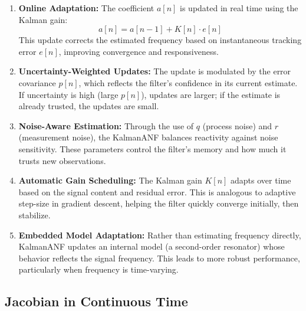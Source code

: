 \documentclass{article}
\begin{document}
\begin{enumerate}
  \item \textbf{Online Adaptation:} The coefficient \( a[n] \) is updated in real time using the Kalman gain:
  \[
  a[n] = a[n-1] + K[n] \cdot e[n]
  \]
  This update corrects the estimated frequency based on instantaneous tracking error \( e[n] \), improving convergence and responsiveness.

  \item \textbf{Uncertainty-Weighted Updates:} The update is modulated by the error covariance \( p[n] \), which reflects the filter's confidence in its current estimate. If uncertainty is high (large \( p[n] \)), updates are larger; if the estimate is already trusted, the updates are small.

  \item \textbf{Noise-Aware Estimation:} Through the use of \( q \) (process noise) and \( r \) (measurement noise), the KalmanANF balances reactivity against noise sensitivity. These parameters control the filter’s memory and how much it trusts new observations.

  \item \textbf{Automatic Gain Scheduling:} The Kalman gain \( K[n] \) adapts over time based on the signal content and residual error. This is analogous to adaptive step-size in gradient descent, helping the filter quickly converge initially, then stabilize.

  \item \textbf{Embedded Model Adaptation:} Rather than estimating frequency directly, KalmanANF updates an internal model (a second-order resonator) whose behavior reflects the signal frequency. This leads to more robust performance, particularly when frequency is time-varying.
\end{enumerate}

\subsection{Jacobian in Continuous Time}
\end{document}

